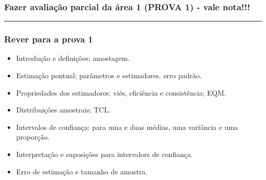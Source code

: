 \documentclass[
]{article}
\providecommand{\tightlist}{%
  \setlength{\itemsep}{0pt}\setlength{\parskip}{0pt}}
\begin{document}
\hypertarget{fazer-avaliauxe7uxe3o-parcial-da-uxe1rea-1-prova-1---vale-nota}{%
\subsubsection{Fazer avaliação parcial da área 1 (PROVA 1) - vale
nota!!!}\label{fazer-avaliauxe7uxe3o-parcial-da-uxe1rea-1-prova-1---vale-nota}}

\begin{center}\rule{0.5\linewidth}{0.5pt}\end{center}

\vspace{0.5cm}

\hypertarget{rever-para-a-prova-1}{%
\subsubsection{Rever para a prova 1}\label{rever-para-a-prova-1}}

\begin{itemize}
\tightlist
\item
  Introdução e definições; amostagem.
\item
  Estimação pontual; parâmetros e estimadores. erro padrão.
\item
  Propriedades dos estimadores; viés, eficiência e consistência; EQM.
\item
  Distribuições amostrais; TCL.
\item
  Intervalos de confiança: para uma e duas médias, uma variância e uma
  proporção.
\item
  Interpretação e suposições para intervalors de confiança.
\item
  Erro de estimação e tamanho de amostra.
\end{itemize}
\end{document}

